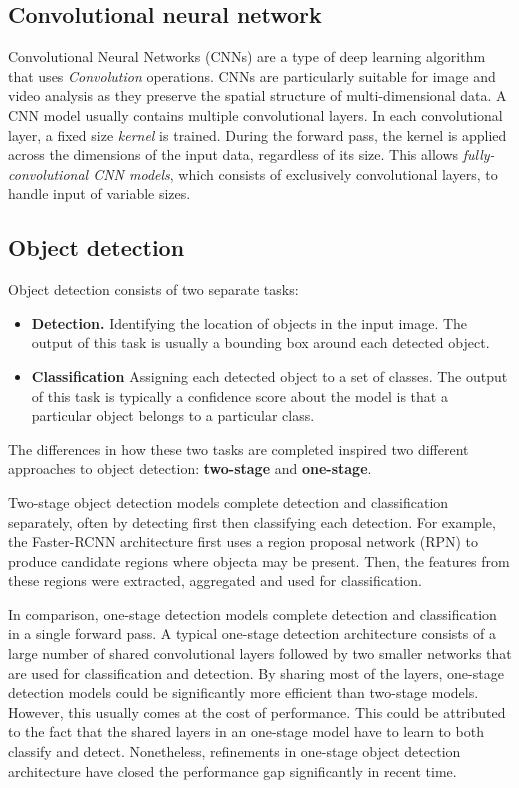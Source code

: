 \documentclass[12pt,a4paper,twoside,openany]{report}
\begin{document}
\subsection{Convolutional neural network}
Convolutional Neural Networks (CNNs) are a type of deep learning algorithm that uses \textit{Convolution} operations. CNNs are particularly suitable for image and video analysis as they preserve the spatial structure of multi-dimensional data. A CNN model usually contains multiple convolutional layers. In each convolutional layer, a fixed size \textit{kernel} is trained. During the forward pass, the kernel is applied across the dimensions of the input data, regardless of its size. This allows \textit{fully-convolutional CNN models}, which consists of exclusively convolutional layers, to handle input of variable sizes.

\subsection{Object detection}
Object detection consists of two separate tasks:
\begin{itemize}
    \item \textbf{Detection.} Identifying the location of objects in the input image. The output of this task is usually a bounding box around each detected object.
    \item \textbf{Classification} Assigning each detected object to a set of classes. The output of this task is typically a confidence score about the model is that a particular object belongs to a particular class.
\end{itemize}

The differences in how these two tasks are completed inspired two different approaches to object detection: \textbf{two-stage} and \textbf{one-stage}.

Two-stage object detection models complete detection and classification separately, often by detecting first then classifying each detection. For example, the Faster-RCNN architecture \cite{ren_faster_2016} first uses a region proposal network (RPN) to produce candidate regions where objecta may be present. Then, the features from these regions were extracted, aggregated and used for classification.

In comparison, one-stage detection models complete detection and classification in a single forward pass. A typical one-stage detection architecture consists of a large number of shared convolutional layers followed by two smaller networks that are used for classification and detection. 
By sharing most of the layers, one-stage detection models could be significantly more efficient than two-stage models. However, this usually comes at the cost of performance. This could be  attributed to the fact that the shared layers in an one-stage model have to learn to both classify and detect. Nonetheless, refinements in one-stage object detection architecture have closed the performance gap significantly in recent time. 
\end{document}
